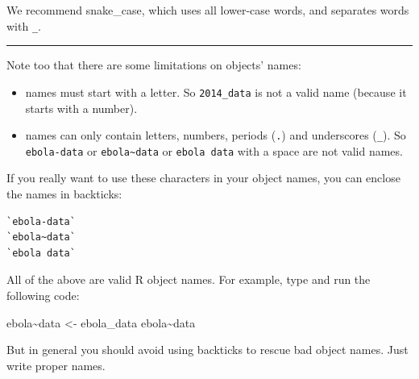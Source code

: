 \documentclass[
  letterpaper,
  DIV=11,
  numbers=noendperiod]{scrreprt}
\newenvironment{Shaded}{\begin{snugshade}}{\end{snugshade}}
\newcommand{\AttributeTok}[1]{\textcolor[rgb]{0.40,0.45,0.13}{#1}}
\newcommand{\NormalTok}[1]{\textcolor[rgb]{0.00,0.23,0.31}{#1}}
\newcommand{\OtherTok}[1]{\textcolor[rgb]{0.00,0.23,0.31}{#1}}
\newcommand{\StringTok}[1]{\textcolor[rgb]{0.13,0.47,0.30}{#1}}
\begin{document}
We recommend snake\_case, which uses all lower-case words, and separates
words with \texttt{\_}.

\begin{center}\rule{0.5\linewidth}{0.5pt}\end{center}

Note too that there are some limitations on objects' names:

\begin{itemize}
\item
  names must start with a letter. So \texttt{2014\_data} is not a valid
  name (because it starts with a number).
\item
  names can only contain letters, numbers, periods (\texttt{.}) and
  underscores (\texttt{\_}). So \texttt{ebola-data} or
  \texttt{ebola\textasciitilde{}data} or \texttt{ebola\ data} with a
  space are not valid names.
\end{itemize}

If you really want to use these characters in your object names, you can
enclose the names in backticks:

\begin{verbatim}
`ebola-data`
`ebola~data`
`ebola data`
\end{verbatim}

All of the above are valid R object names. For example, type and run the
following code:

\begin{Shaded}
\begin{Highlighting}[]
\StringTok{\textasciigrave{}}\AttributeTok{ebola\textasciitilde{}data}\StringTok{\textasciigrave{}} \OtherTok{\textless{}{-}}\NormalTok{ ebola\_data}
\StringTok{\textasciigrave{}}\AttributeTok{ebola\textasciitilde{}data}\StringTok{\textasciigrave{}}
\end{Highlighting}
\end{Shaded}

But in general you should avoid using backticks to rescue bad object
names. Just write proper names.
\end{document}
